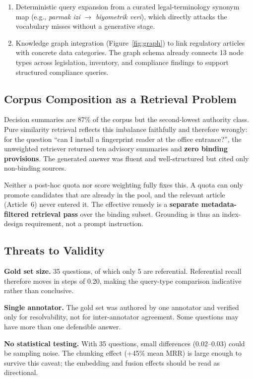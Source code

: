 \documentclass[11pt,a4paper,twocolumn]{article}
\begin{document}
\begin{enumerate}[leftmargin=*]
  \item Deterministic query expansion from a curated legal-terminology synonym map (e.g., \textit{parmak izi} $\rightarrow$ \textit{biyometrik veri}), which directly attacks the vocabulary misses without a generative stage.
  \item Knowledge graph integration (Figure~\ref{fig:graph}) to link regulatory articles with concrete data categories. The graph schema already connects 13 node types across legislation, inventory, and compliance findings to support structured compliance queries.
\end{enumerate}

\subsection{Corpus Composition as a Retrieval Problem}

Decision summaries are 87\% of the corpus but the second-lowest authority class. Pure similarity retrieval reflects this imbalance faithfully and therefore wrongly: for the question ``can I install a fingerprint reader at the office entrance?'', the unweighted retriever returned ten advisory summaries and \textbf{zero binding provisions}. The generated answer was fluent and well-structured but cited only non-binding sources.

Neither a post-hoc quota nor score weighting fully fixes this. A quota can only promote candidates that are already in the pool, and the relevant article (Article~6) never entered it. The effective remedy is a \textbf{separate metadata-filtered retrieval pass} over the binding subset. Grounding is thus an index-design requirement, not a prompt instruction.

\subsection{Threats to Validity}

\textbf{Gold set size.} 35 questions, of which only 5 are referential. Referential recall therefore moves in steps of 0.20, making the query-type comparison indicative rather than conclusive.

\textbf{Single annotator.} The gold set was authored by one annotator and verified only for resolvability, not for inter-annotator agreement. Some questions may have more than one defensible answer.

\textbf{No statistical testing.} With 35 questions, small differences (0.02--0.03) could be sampling noise. The chunking effect (+45\% mean MRR) is large enough to survive this caveat; the embedding and fusion effects should be read as directional.
\end{document}
